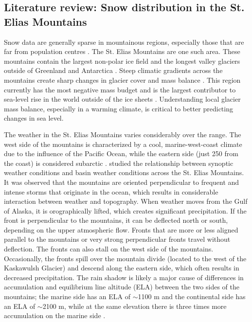 \documentclass{sfuthesis}
\begin{document}
{\begin{appendices}
\chapter{Literature review: Snow distribution in the St. Elias Mountains}

Snow data are generally sparse in mountainous regions, especially those that are far from population centres \citep{Marcus1970}. The St. Elias Mountains are one such area. These mountains contain the largest non-polar ice field and the longest valley glaciers outside of Greenland and Antarctica \citep{Marcus1970, Danby2003}. Steep climatic gradients across the mountains create sharp changes in glacier cover and mass balance \citep{Clarke2002}. This region currently has the most negative mass budget and is the largest contributor to sea-level rise in the world outside of the ice sheets \citep{Kaser2006, Gardner2013}. Understanding local glacier mass balance, especially in a warming climate, is critical to better predicting changes in sea level. 

The weather in the St. Elias Mountains varies considerably over the range. The west side of the mountains is characterized by a cool, marine-west-coast climate due to the influence of the Pacific Ocean, while the eastern side (just 250 from the coast) is considered subarctic \citep{Marcus1970}. \cite{Taylor1969} studied the relationship between synoptic weather conditions and basin weather conditions across the St. Elias Mountains. It was observed that the mountains are oriented perpendicular to frequent and intense storms that originate in the ocean, which results in considerable interaction between weather and topography. When weather moves from the Gulf of Alaska, it is orographically lifted, which creates significant precipitation. If the front is perpendicular to the mountains, it can be deflected north or south, depending on the upper atmospheric flow. Fronts that are more or less aligned parallel to the mountains or very strong perpendicular fronts travel without deflection. The fronts can also stall on the west side of the mountains. Occasionally, the fronts spill over the mountain divide (located to the west of the Kaskawulsh Glacier) and descend along the eastern side, which often results in decreased precipitation. The rain shadow is likely a major cause of differences in accumulation and equilibrium line altitude (ELA) between the two sides of the mountains; the marine side has an ELA of $\sim$1100 m and the continental side has an ELA of $\sim$2100 m, while at the same elevation there is three times more accumulation on the marine side \citep{Marcus1970}.


\end{appendices}}
\end{document}
